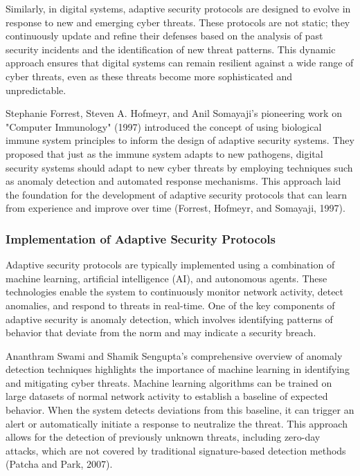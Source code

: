 \documentclass[12pt,twoside]{article}
\begin{document}
Similarly, in digital systems, adaptive security protocols are designed to evolve in response to new and emerging cyber threats. These protocols are not static; they continuously update and refine their defenses based on the analysis of past security incidents and the identification of new threat patterns. This dynamic approach ensures that digital systems can remain resilient against a wide range of cyber threats, even as these threats become more sophisticated and unpredictable.

Stephanie Forrest, Steven A. Hofmeyr, and Anil Somayaji's pioneering work on "Computer Immunology" (1997) introduced the concept of using biological immune system principles to inform the design of adaptive security systems. They proposed that just as the immune system adapts to new pathogens, digital security systems should adapt to new cyber threats by employing techniques such as anomaly detection and automated response mechanisms. This approach laid the foundation for the development of adaptive security protocols that can learn from experience and improve over time (Forrest, Hofmeyr, and Somayaji, 1997).

\subsubsection{Implementation of Adaptive Security Protocols}

Adaptive security protocols are typically implemented using a combination of machine learning, artificial intelligence (AI), and autonomous agents. These technologies enable the system to continuously monitor network activity, detect anomalies, and respond to threats in real-time. One of the key components of adaptive security is anomaly detection, which involves identifying patterns of behavior that deviate from the norm and may indicate a security breach.

Ananthram Swami and Shamik Sengupta's comprehensive overview of anomaly detection techniques highlights the importance of machine learning in identifying and mitigating cyber threats. Machine learning algorithms can be trained on large datasets of normal network activity to establish a baseline of expected behavior. When the system detects deviations from this baseline, it can trigger an alert or automatically initiate a response to neutralize the threat. This approach allows for the detection of previously unknown threats, including zero-day attacks, which are not covered by traditional signature-based detection methods (Patcha and Park, 2007).
\end{document}
